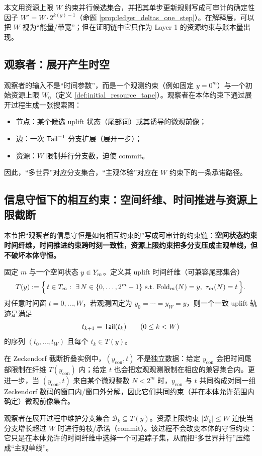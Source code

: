 \begin{remark}[与资源上限的关系]
本文用资源上限 \(W\) 约束并行候选集合，并把其单步更新规则写成可审计的确定性因子 \(W'=W\cdot 2^{k(y)-1}\)（命题 \ref{prop:ledger_deltas_one_step}）。在解释层，可以把 \(W\) 视为“能量/带宽”；但在证明链中它只作为 Layer 1 的资源约束与账本量出现。
\end{remark}

\subsection{观察者：展开产生时空}
观察者的输入不是“时间参数”，而是一个观测约束（例如固定 \(y=0^m\)）与一个初始资源上限 \(W_0\)（定义 \ref{def:initial_resource_tape}）。观察者在本体约束下通过展开过程生成一张搜索图：
\begin{itemize}
  \item 节点：某个候选 uplift 状态（尾部词）或其诱导的微观前像；
  \item 边：一次 \(\mathsf{Tail}^{-1}\) 分支扩展（展开一步）；
  \item 资源：\(W\) 限制并行分支数，迫使 commit。
\end{itemize}
因此，“多世界”对应分支集合，“主观体验”对应在 \(W\) 约束下的一条承诺路径。

\subsection{信息守恒下的相互约束：空间纤维、时间推进与资源上限截断}

本节把“观察者的信息守恒是如何相互约束的”写成可审计的约束链：\textbf{空间状态约束时间纤维，时间推进约束跨时刻一致性，资源上限约束把多分支压成主观单线，但不破坏本体守恒。}

\begin{definition}[时间纤维与分支集合]\label{def:fiber_T_of_y}
固定 \(m\) 与一个空间状态 \(y\in Y_m\)。定义其 uplift 时间纤维（可兼容尾部集合）
$$
T(y):=\Bigl\{\,t\in T_m:\ \exists\,N\in\{0,\dots,2^m-1\}\ \text{s.t.}\ \Fold(N)=y,\ \tautime_m(N)=t\,\Bigr\}.
$$
对任意时间窗 \(t=0,\dots,W\)，若观测固定为 \(y_0=\cdots=y_W=y\)，则一个一致 uplift 轨迹是满足
$$
t_{k+1}=\mathsf{Tail}(t_k)\qquad(0\le k<W)
$$
的序列 \((t_0,\dots,t_W)\) 且每个 \(t_k\in T(y)\)。
\end{definition}

\begin{proposition}[空间与时间的相互制约]\label{prop:space_time_mutual_constraints}
在 Zeckendorf 截断折叠实例中，\((y_{\mathrm{con}},t)\) 不是独立数据：给定 \(y_{\mathrm{con}}\) 会把时间尾部限制在纤维 \(T(y_{\mathrm{con}})\) 内；给定 \(t\) 也会把宏观观测限制在相应的兼容集合内。更进一步，当 \((y_{\mathrm{con}},t)\) 来自某个微观整数 \(N<2^m\) 时，\(y_{\mathrm{con}}\) 与 \(t\) 共同构成对同一组 Zeckendorf 数码的窗口内/窗口外分解，因此它们共同约束（并在本体允许范围内确定）微观前像集合。
\end{proposition}

\begin{remark}[资源上限与主观单线不破坏守恒]\label{rem:energy_commit_ledger}
观察者在展开过程中维护分支集合 \(\mathcal B_k\subseteq T(y)\)。资源上限约束 \(|\mathcal B_k|\le W\) 迫使当分支增长超过 \(W\) 时进行剪枝/承诺（commit）。该过程不会改变本体的守恒约束：它只是在本体允许的时间纤维中选择一个可追踪子集，从而把“多世界并行”压缩成“主观单线”。
\end{remark}

